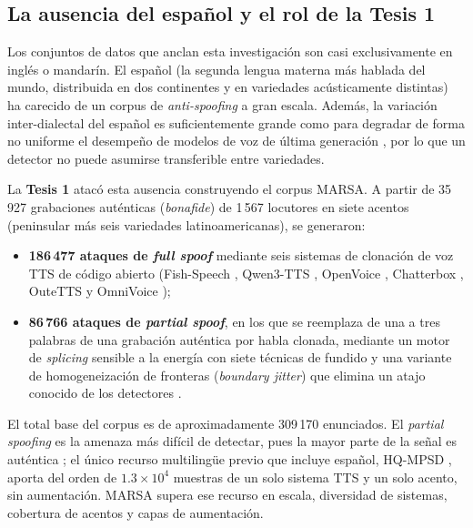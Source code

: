 \documentclass[11pt]{article}
\begin{document}
\subsection{La ausencia del espa\~nol y el rol de la Tesis 1}

Los conjuntos de datos que anclan esta investigaci\'on son casi
exclusivamente en ingl\'es o mandar\'in. El espa\~nol (la segunda lengua
materna m\'as hablada del mundo, distribuida en dos continentes y en
variedades ac\'usticamente distintas) ha carecido de un corpus de
\emph{anti-spoofing} a gran escala. Adem\'as, la variaci\'on
inter-dialectal del espa\~nol es suficientemente grande como para
degradar de forma no uniforme el desempe\~no de modelos de voz de \'ultima
generaci\'on
\citep{kantharuban2023dialectgap,nacimiento2024biases,zuluaga2023commonaccent},
por lo que un detector no puede asumirse transferible entre variedades.

La \textbf{Tesis 1} atac\'o esta ausencia construyendo el corpus MARSA. A
partir de 35\,927 grabaciones aut\'enticas (\emph{bonafide}) de 1\,567
locutores en siete acentos (peninsular m\'as seis variedades
latinoamericanas), se generaron:
\begin{itemize}[nosep]
  \item \textbf{186\,477 ataques de \emph{full spoof}} mediante seis
  sistemas de clonaci\'on de voz TTS de c\'odigo abierto (Fish-Speech
  \citep{fishspeech}, Qwen3-TTS \citep{qwen3tts}, OpenVoice
  \citep{openvoice}, Chatterbox \citep{chatterbox}, OuteTTS
  \citep{outetts} y OmniVoice \citep{omnivoice});
  \item \textbf{86\,766 ataques de \emph{partial spoof}}, en los que se
  reemplaza de una a tres palabras de una grabaci\'on aut\'entica por
  habla clonada, mediante un motor de \emph{splicing} sensible a la
  energ\'ia con siete t\'ecnicas de fundido y una variante de
  homogeneizaci\'on de fronteras (\emph{boundary jitter}) que elimina un
  atajo conocido de los detectores \citep{negroni2024splicing}.
\end{itemize}
El total base del corpus es de aproximadamente 309\,170 enunciados. El
\emph{partial spoofing} es la amenaza m\'as dif\'icil de detectar, pues la
mayor parte de la se\~nal es aut\'entica \citep{zhang2023partialspoof}; el
\'unico recurso multiling\"ue previo que incluye espa\~nol, HQ-MPSD
\citep{li2025hqmpsd}, aporta del orden de $1.3\times10^{4}$ muestras de un
solo sistema TTS y un solo acento, sin aumentaci\'on. MARSA supera ese
recurso en escala, diversidad de sistemas, cobertura de acentos y capas
de aumentaci\'on.
\end{document}
